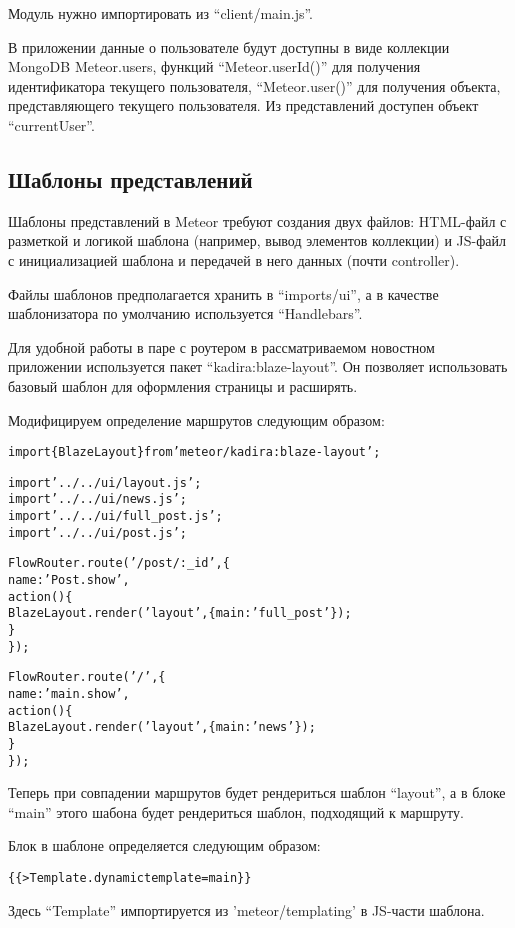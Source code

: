 \documentclass[a4paper,12pt]{article}
\begin{document}
Модуль нужно импортировать из ``client/main.js''.

В приложении данные о пользователе будут доступны
в виде коллекции MongoDB Meteor.users, функций
``Meteor.userId()'' для получения идентификатора
текущего пользователя, ``Meteor.user()'' для
получения объекта, представляющего текущего пользователя.
Из представлений доступен объект ``currentUser''. 

\subsection{Шаблоны представлений}
Шаблоны представлений в Meteor требуют создания
двух файлов: HTML-файл с разметкой и логикой
шаблона (например, вывод элементов коллекции) и 
JS-файл с инициализацией шаблона и передачей
в него данных (почти controller).

Файлы шаблонов предполагается хранить в ``imports/ui'',
а в качестве шаблонизатора по умолчанию используется
``Handlebars''.

Для удобной работы в паре с роутером в рассматриваемом
новостном приложении используется пакет
``kadira:blaze-layout''. Он позволяет использовать
базовый шаблон для оформления страницы и расширять.

Модифицируем определение маршрутов следующим образом:

\begin{alltt}
import \{ BlazeLayout \} from 'meteor/kadira:blaze-layout';	
	
import '../../ui/layout.js';
import '../../ui/news.js';
import '../../ui/full\_post.js';
import '../../ui/post.js';	
	
FlowRouter.route('/post/:\_id', \{
    name: 'Post.show',
    action() \{  
        BlazeLayout.render('layout', \{ main: 'full\_post' \});
    \}
\});

FlowRouter.route('/', \{
    name: 'main.show',
    action() \{  
	    BlazeLayout.render('layout', \{ main: 'news' \});
    \}
\});
\end{alltt}

Теперь при совпадении маршрутов будет рендериться шаблон
``layout'', а в блоке ``main'' этого шабона будет 
рендериться шаблон, подходящий к маршруту.

Блок в шаблоне определяется следующим образом:
\begin{alltt}
\{\{> Template.dynamic template=main\}\}
\end{alltt}

Здесь ``Template'' импортируется из 'meteor/templating'
в JS-части шаблона.
\end{document}
